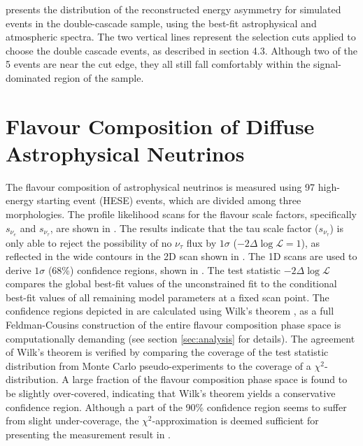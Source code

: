  presents the distribution of the reconstructed energy asymmetry for simulated events in the double-cascade sample, using the best-fit astrophysical and atmospheric spectra. The two vertical lines represent the selection cuts applied to choose the double cascade events, as described in section 4.3. Although two of the 5 events are near the cut edge, they all still fall comfortably within the signal-dominated region of the sample.

\section{Flavour Composition of Diffuse Astrophysical Neutrinos}
\label{sec:flavour_results}
The flavour composition of astrophysical neutrinos is measured using 97 high-energy starting event (HESE) events, which are divided among three morphologies. The profile likelihood scans for the flavour scale factors, specifically $s_{\nu_{e}}$ and $s_{\nu_{\tau}}$, are shown in . The results indicate that the tau scale factor ($s_{\nu_{\tau}}$) is only able to reject the possibility of no $\nu_{\tau}$ flux by $1\sigma$ ($-2\Delta \log \mathcal{L}=1$), as reflected in the wide contours in the 2D scan shown in . The 1D scans are used to derive $1\sigma$ (68\%) confidence regions, shown in . The test statistic $-2\Delta \log \mathcal{L}$ compares the global best-fit values of the unconstrained fit to the conditional best-fit values of all remaining model parameters at a fixed scan point. The confidence regions depicted in  are calculated using Wilk's theorem  , as a full Feldman-Cousins construction of the entire flavour composition phase space is computationally demanding (see section \ref{sec:analysis} for details). The agreement of Wilk's theorem is verified by comparing the coverage of the test statistic distribution from Monte Carlo pseudo-experiments to the coverage of a $\chi^2$-distribution. A large fraction of the flavour composition phase space is found to be slightly over-covered, indicating that Wilk's theorem yields a conservative confidence region. Although a part of the 90\% confidence region seems to suffer from slight under-coverage, the $\chi^2$-approximation is deemed sufficient for presenting the measurement result in . 
